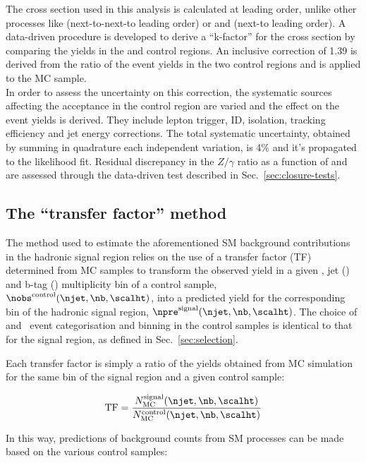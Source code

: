 The \gj cross section used in this analysis is calculated at leading
order, unlike other processes like \ttj (next-to-next-to leading
order) or \zj and \wj (next-to leading order).  A data-driven
procedure is developed to derive a ``k-factor'' for the \gj cross
section by comparing the yields in the \gj and \mmj control regions.
An inclusive correction of 1.39 is derived from the ratio of the event
yields in the two
control regions and is applied to the \gj MC sample. \\
In order to assess the uncertainty on this correction, the systematic
sources affecting the acceptance in the \mmj control region are varied
and the effect on the event yields is derived.  They include lepton
trigger, ID, isolation, tracking efficiency and jet energy
corrections.  The total systematic uncertainty, obtained by summing in
quadrature each independent variation, is 4\% and it's propagated to
the likelihood fit.  Residual discrepancy in the $Z/\gamma$ ratio as a
function of \scalht and \njet are assessed through the data-driven
test described in Sec.~\ref{sec:closure-tests}.


\subsection{The ``transfer factor'' method}
\label{sec:ewk-method}

The method used to estimate the aforementioned SM background
contributions in the hadronic signal region relies on the use of a
transfer factor (TF) determined from MC samples to transform the
observed yield in a given \scalht, jet (\njet) and b-tag (\nb)
multiplicity bin of a control sample, $\nobs^{\rm
  control}(\njet,\nb,\scalht)$, into a predicted yield for the
corresponding bin of the hadronic signal region, $\npre^{\rm
  signal}(\njet,\nb,\scalht)$. The choice of \njet and \nb~event
categorisation and \scalht binning in the control samples is identical
to that for the signal region, as defined in
Sec.~\ref{sec:selection}. 

Each transfer factor is simply a ratio of the yields obtained from MC
simulation for the same bin of the signal region and a given control
sample:

\begin{equation}
  \label{equ:tf-ratio}
  {\rm TF} = \frac{N_{\rm MC}^{\rm signal}(\njet,\nb,\scalht)}{N_{\rm
      MC}^{\rm control}(\njet,\nb,\scalht)} 
\end{equation}

In this way, predictions of background counts from SM processes can be
made based on the various control samples:

